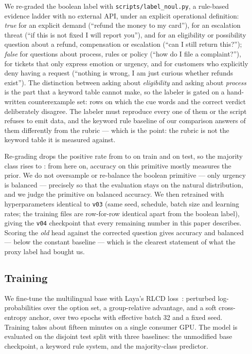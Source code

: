 \documentclass[11pt,a4paper]{article}
\begin{document}
We re-graded the boolean label with \texttt{scripts/label\_noul.py}, a rule-based evidence ladder with no external API, under an explicit operational definition: \emph{true} for an explicit demand (``refund the money to my card''), for an escalation threat (``if this is not fixed I will report you''), and for an eligibility or possibility question about a refund, compensation or escalation (``can I still return this?''); \emph{false} for questions about process, rules or policy (``how do I file a complaint?''), for tickets that only express emotion or urgency, and for customers who explicitly deny having a request (``nothing is wrong, I am just curious whether refunds exist''). The distinction between asking about \emph{eligibility} and asking about \emph{process} is the part that a keyword table cannot make, so the labeler is gated on a hand-written counterexample set: \NoulAntibodyN{} rows on which the cue words and the correct verdict deliberately disagree. The labeler must reproduce every one of them or the script refuses to emit data, and the keyword rule baseline of our comparison answers \NoulGateDisagree{} of them differently from the rubric --- which is the point: the rubric is not the keyword table it is measured against.

Re-grading drops the positive rate from \NoulPosBefore{} to \NoulPosTrainAfter{} on train and \NoulPosTestAfter{} on test, so the majority class rises to \NoulMajTestAfter{}: from here on, accuracy on this primitive mostly measures the prior. We do not oversample or re-balance the boolean primitive --- only urgency is balanced --- precisely so that the evaluation stays on the natural distribution, and we judge the primitive on balanced accuracy. We then retrained with hyperparameters identical to \texttt{v03} (same seed, schedule, batch size and learning rates; the training files are row-for-row identical apart from the boolean label), giving the \texttt{v04} checkpoint that every remaining number in this paper describes. Scoring the \emph{old} head against the corrected question gives \OldHeadAccNoul{} accuracy and \OldHeadBAccNoul{} balanced --- below the \MajAccNoul{} constant baseline --- which is the clearest statement of what the proxy label had bought us.

\subsection{Training}

We fine-tune the multilingual base with Laya's RLCD loss~\cite{laya}: perturbed log-probabilities over the option set, a group-relative advantage, and a soft cross-entropy anchor, over two epochs with effective batch 32 and a fixed seed. Training takes about fifteen minutes on a single consumer GPU. The model is evaluated on the disjoint test split with three baselines: the unmodified base checkpoint, a keyword rule system, and the majority-class predictor.
\end{document}
